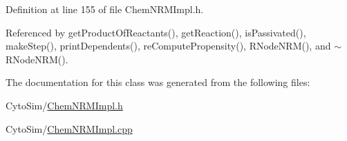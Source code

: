 Definition at line 155 of file Chem\-N\-R\-M\-Impl.\-h.



Referenced by get\-Product\-Of\-Reactants(), get\-Reaction(), is\-Passivated(), make\-Step(), print\-Dependents(), re\-Compute\-Propensity(), R\-Node\-N\-R\-M(), and $\sim$\-R\-Node\-N\-R\-M().



The documentation for this class was generated from the following files\-:\begin{DoxyCompactItemize}
\item 
Cyto\-Sim/\hyperlink{ChemNRMImpl_8h}{Chem\-N\-R\-M\-Impl.\-h}\item 
Cyto\-Sim/\hyperlink{ChemNRMImpl_8cpp}{Chem\-N\-R\-M\-Impl.\-cpp}\end{DoxyCompactItemize}
